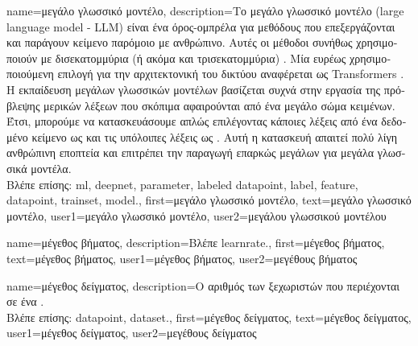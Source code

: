 {name={\foreignlanguage{greek}{μεγάλο γλωσσικό μοντέλο}},
	description={\foreignlanguage{greek}{Το μεγάλο γλωσσικό μοντέλο} 
		(large language model - LLM) \foreignlanguage{greek}{είναι ένα όρος-ομπρέλα για μεθόδους}  \foreignlanguage{greek}{που 
		επεξεργάζονται και παράγουν κείμενο παρόμοιο με ανθρώπινο. Αυτές οι μέθοδοι συνήθως χρησιμοποιούν} 
		 \foreignlanguage{greek}{με δισεκατομμύρια (ή ακόμα και τρισεκατομμύρια)} . 
		\foreignlanguage{greek}{Μία ευρέως χρησιμοποιούμενη επιλογή για την αρχιτεκτονική του δικτύου αναφέρεται ως} Transformers 
		\cite{vaswani2017attention}. \foreignlanguage{greek}{Η εκπαίδευση μεγάλων γλωσσικών μοντέλων βασίζεται συχνά στην εργασία της πρόβλεψης 
		μερικών λέξεων που σκόπιμα αφαιρούνται από ένα μεγάλο σώμα κειμένων. Έτσι, μπορούμε να κατασκευάσουμε}  
		\foreignlanguage{greek}{απλώς επιλέγοντας κάποιες λέξεις από ένα δεδομένο κείμενο ως}  \foreignlanguage{greek}{και τις υπόλοιπες 
		λέξεις ως}  . \foreignlanguage{greek}{Αυτή η κατασκευή απαιτεί πολύ λίγη ανθρώπινη εποπτεία 
		και επιτρέπει την παραγωγή επαρκώς μεγάλων}  \foreignlanguage{greek}{για μεγάλα γλωσσικά μοντέλα.} \\
		\foreignlanguage{greek}{Βλέπε επίσης:} \gls{ml}, \gls{deepnet}, \gls{parameter}, \gls{labeled datapoint}, \gls{label}, \gls{feature}, 
		\gls{datapoint}, \gls{trainset}, \gls{model}.},
	first={\foreignlanguage{greek}{μεγάλο γλωσσικό μοντέλο}},
	text={\foreignlanguage{greek}{μεγάλο γλωσσικό μοντέλο}},
	user1={\foreignlanguage{greek}{μεγάλο γλωσσικό μοντέλο}}, %
	user2={\foreignlanguage{greek}{μεγάλου γλωσσικού μοντέλου}} %
}

{name={\foreignlanguage{greek}{μέγεθος βήματος}}, 
	description={\foreignlanguage{greek}{Βλέπε} \gls{learnrate}.}, 
	first={\foreignlanguage{greek}{μέγεθος βήματος}},
	text={\foreignlanguage{greek}{μέγεθος βήματος}},
	user1={\foreignlanguage{greek}{μέγεθος βήματος}}, %
  	user2={\foreignlanguage{greek}{μεγέθους βήματος}} %
}

{name={\foreignlanguage{greek}{μέγεθος δείγματος}},
	description={\foreignlanguage{greek}{Ο} 
		\foreignlanguage{greek}{αριθμός των ξεχωριστών}  \foreignlanguage{greek}{που περιέχονται 
		σε ένα} .\\
		\foreignlanguage{greek}{Βλέπε επίσης:} \gls{datapoint}, \gls{dataset}.},
	first={\foreignlanguage{greek}{μέγεθος δείγματος}},
	text={\foreignlanguage{greek}{μέγεθος δείγματος}},
	user1={\foreignlanguage{greek}{μέγεθος δείγματος}}, %
	user2={\foreignlanguage{greek}{μεγέθους δείγματος}} %
}

